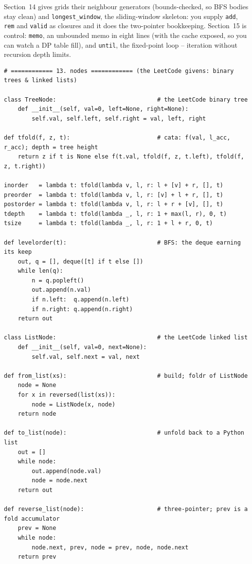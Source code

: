 \documentclass[11pt,letterpaper]{book}
\begin{document}
Section~14 gives grids their neighbour generators (bounds-checked, so BFS
bodies stay clean) and \texttt{longest\_window}, the sliding-window skeleton:
you supply \texttt{add}, \texttt{rem} and \texttt{valid} as closures and it
does the two-pointer bookkeeping. Section~15 is control: \texttt{memo},
an unbounded memo in eight lines (with the cache exposed, so you can watch a DP
table fill), and \texttt{until}, the fixed-point loop -- iteration without
recursion depth limits.
\begin{lstlisting}[style=code]
# ============ 13. nodes ============ (the LeetCode givens: binary trees & linked lists)

class TreeNode:                             # the LeetCode binary tree
    def __init__(self, val=0, left=None, right=None):
        self.val, self.left, self.right = val, left, right

def tfold(f, z, t):                         # cata: f(val, l_acc, r_acc); depth = tree height
    return z if t is None else f(t.val, tfold(f, z, t.left), tfold(f, z, t.right))

inorder   = lambda t: tfold(lambda v, l, r: l + [v] + r, [], t)
preorder  = lambda t: tfold(lambda v, l, r: [v] + l + r, [], t)
postorder = lambda t: tfold(lambda v, l, r: l + r + [v], [], t)
tdepth    = lambda t: tfold(lambda _, l, r: 1 + max(l, r), 0, t)
tsize     = lambda t: tfold(lambda _, l, r: 1 + l + r, 0, t)

def levelorder(t):                          # BFS: the deque earning its keep
    out, q = [], deque([t] if t else [])
    while len(q):
        n = q.popleft()
        out.append(n.val)
        if n.left:  q.append(n.left)
        if n.right: q.append(n.right)
    return out

class ListNode:                             # the LeetCode linked list
    def __init__(self, val=0, next=None):
        self.val, self.next = val, next

def from_list(xs):                          # build; foldr of ListNode
    node = None
    for x in reversed(list(xs)):
        node = ListNode(x, node)
    return node

def to_list(node):                          # unfold back to a Python list
    out = []
    while node:
        out.append(node.val)
        node = node.next
    return out

def reverse_list(node):                     # three-pointer; prev is a fold accumulator
    prev = None
    while node:
        node.next, prev, node = prev, node, node.next
    return prev


\end{lstlisting}
\end{document}
